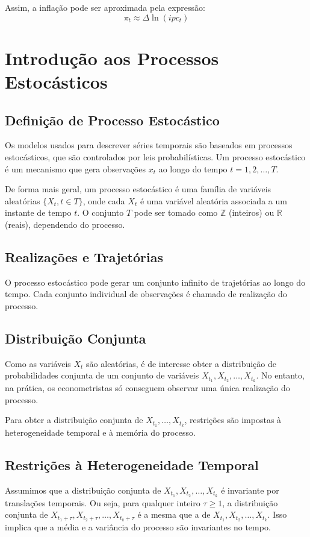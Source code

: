 \documentclass{sciposter}
\begin{document}
\begin{multicols}{3}
Assim, a inflação pode ser aproximada pela expressão:
\[
\pi_t \approx \Delta \ln(ipc_t)
\]

\section{\textbf{Introdução aos Processos Estocásticos}}

\subsection{Definição de Processo Estocástico}
Os modelos usados para descrever séries temporais são baseados em processos estocásticos, que são controlados por leis probabilísticas. Um processo estocástico é um mecanismo que gera observações $x_t$ ao longo do tempo $t = 1, 2, \ldots, T$. 

De forma mais geral, um processo estocástico é uma família de variáveis aleatórias $\{ X_t, t \in T \}$, onde cada $X_t$ é uma variável aleatória associada a um instante de tempo $t$. O conjunto $T$ pode ser tomado como $\mathbb{Z}$ (inteiros) ou $\mathbb{R}$ (reais), dependendo do processo.

\subsection{Realizações e Trajetórias}
O processo estocástico pode gerar um conjunto infinito de trajetórias ao longo do tempo. Cada conjunto individual de observações é chamado de realização do processo.

\subsection{Distribuição Conjunta}
Como as variáveis $X_t$ são aleatórias, é de interesse obter a distribuição de probabilidades conjunta de um conjunto de variáveis $X_{t_1}, X_{t_2}, \dots, X_{t_k}$. No entanto, na prática, os econometristas só conseguem observar uma única realização do processo.

Para obter a distribuição conjunta de $X_{t_1}, \dots, X_{t_k}$, restrições são impostas à heterogeneidade temporal e à memória do processo.

\subsection{Restrições à Heterogeneidade Temporal}
Assumimos que a distribuição conjunta de $X_{t_1}, X_{t_2}, \dots, X_{t_k}$ é invariante por translações temporais. Ou seja, para qualquer inteiro $\tau \geq 1$, a distribuição conjunta de $X_{t_1+\tau}, X_{t_2+\tau}, \dots, X_{t_k+\tau}$ é a mesma que a de $X_{t_1}, X_{t_2}, \dots, X_{t_k}$. Isso implica que a média e a variância do processo são invariantes no tempo.


\end{multicols}
\end{document}
